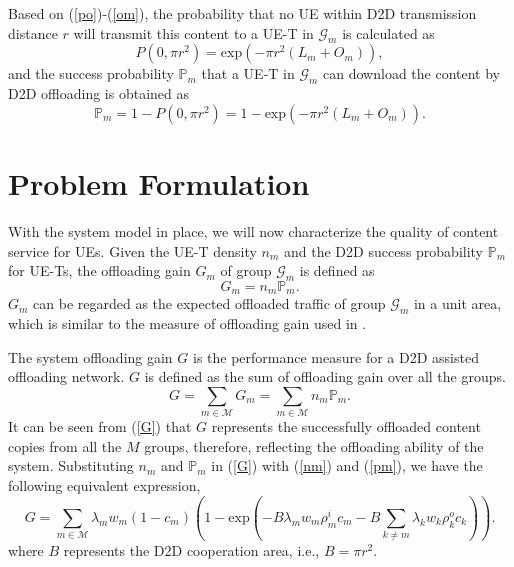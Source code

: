 \documentclass[12pt, draftclsnofoot, onecolumn]{IEEEtran}
\begin{document}
Based on (\ref{po})-(\ref{om}), the probability that no UE within D2D transmission distance $r$ will transmit this content to a UE-T in $\mathcal{G}_m$ is calculated as
\begin{equation}
P(0,\pi r^2) = \textrm{exp}(-\pi r^2(L_m+O_m)),
\end{equation}
and the success probability $\mathbb{P}_m$ that a UE-T in $\mathcal{G}_m$ can download the content by D2D offloading is obtained as
\begin{equation} \label{pm}
\mathbb{P}_m =1-P(0,\pi r^2)=1-\textrm{exp}(-\pi r^2(L_m+O_m)).
\end{equation}





\section{Problem Formulation}
With the system model in place, we will now characterize the quality of content service for UEs.
Given the UE-T density $n_m$ and the D2D success probability $\mathbb{P}_m$ for UE-Ts, the offloading gain $G_m$ of group $\mathcal{G}_m$ is defined as
\begin{equation}
G_m = n_{m}\mathbb{P}_m.
\end{equation}
$G_m$ can be regarded as the expected offloaded traffic of group $\mathcal{G}_m$ in a unit area, which is similar to the measure of offloading gain used in \cite{chen2016cache}.

The system offloading gain $G$ is the performance measure for a D2D assisted offloading network. $G$ is defined as the sum of offloading gain over all the groups.
\begin{equation}\label{G}
G=  \sum \limits_{m \in \mathcal{M}} G_m = \sum \limits_{m \in \mathcal{M}} n_{m}\mathbb{P}_m.
\end{equation}
It can be seen from (\ref{G}) that $G$ represents the successfully offloaded content copies from all the $M$ groups, therefore, reflecting the offloading ability of the system. Substituting $n_{m}$ and $\mathbb{P}_m$ in (\ref{G}) with (\ref{nm}) and (\ref{pm}), we have the following equivalent expression,
\begin{equation}\label{Gc}
G = \sum \limits_{m \in \mathcal{M}} \lambda_m w_m  (1- c_m)
( 1 - \textrm{exp}(-B \lambda_m w_m \rho_m^i c_m
 -B \sum_{k \neq m} \lambda_k w_k \rho_k^o c_k) ).
\end{equation}
where $B$ represents the D2D cooperation area, i.e., $B=\pi r^2$.
\end{document}
